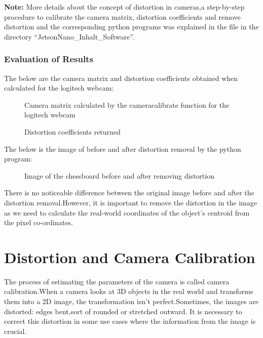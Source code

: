 \textbf{Note:} More details about the concept of distortion in cameras,a step-by-step procedure to calibrate the camera matrix, distortion coefficients and remove distortion and the corresponding python programs  was explained in the file  in the directory ``JetsonNano\_Inhalt\_Software''. 

\subsection{Evaluation of Results}

The below are the camera matrix and distortion coefficients obtained when calculated for the logitech webcam: 

\begin{figure}[H]
	\centering
	\caption{Camera matrix calculated by the cameracalibrate function for the logitech webcam}
\end{figure}

\begin{figure}[H]
	\centering
	\caption{Distortion coefficients returned}
\end{figure}

The below is the image of before and after distortion removal by the python program:

\begin{figure}[H]
	\centering
	\caption{Image of the chessboard before and after removing distortion}
\end{figure}

There is no noticeable difference between the original image before and after the distortion removal.However, it is important to remove the distortion in the image as we need to calculate the real-world coordinates of the object's centroid from the pixel co-ordinates.

\chapter{Distortion and Camera Calibration}
The process of estimating the parameters of the camera is called camera calibration.When a camera looks at 3D objects in the real world and transforms them into a 2D image, the transformation isn’t perfect.Sometimes, the images are distorted: edges bent,sort of rounded or stretched outward. It is necessary to correct this distortion in some use cases where the information from the image is crucial.
